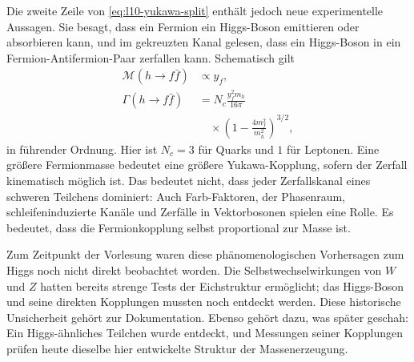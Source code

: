 Die zweite Zeile von \eqref{eq:l10-yukawa-split} enthält jedoch neue experimentelle Aussagen. Sie besagt, dass ein Fermion ein Higgs-Boson emittieren oder absorbieren kann, und im gekreuzten Kanal gelesen, dass ein Higgs-Boson in ein Fermion-Antifermion-Paar zerfallen kann. Schematisch gilt
\begin{equation}
\begin{aligned}
  \mathcal M(h\to f\bar f)&\propto y_f,
  \\
  \Gamma(h\to f\bar f)
  &=
  N_c\frac{y_f^2m_h}{16\pi}
  \\
  &\quad\times
  \left(1-\frac{4m_f^2}{m_h^2}\right)^{3/2},
\end{aligned}
  \label{eq:l10-higgs-fermion-width}
\end{equation}
in führender Ordnung. Hier ist \(N_c=3\) für Quarks und \(1\) für Leptonen. Eine größere Fermionmasse bedeutet eine größere Yukawa-Kopplung, sofern der Zerfall kinematisch möglich ist. Das bedeutet nicht, dass jeder Zerfallskanal eines schweren Teilchens dominiert: Auch Farb-Faktoren, der Phasenraum, schleifeninduzierte Kanäle und Zerfälle in Vektorbosonen spielen eine Rolle. Es bedeutet, dass die Fermionkopplung selbst proportional zur Masse ist.

\begin{classroomqa}
\end{classroomqa}

Zum Zeitpunkt der Vorlesung waren diese phänomenologischen Vorhersagen zum Higgs noch nicht direkt beobachtet worden. Die Selbstwechselwirkungen von \(W\) und \(Z\) hatten bereits strenge Tests der Eichstruktur ermöglicht; das Higgs-Boson und seine direkten Kopplungen mussten noch entdeckt werden. Diese historische Unsicherheit gehört zur Dokumentation. Ebenso gehört dazu, was später geschah: Ein Higgs-ähnliches Teilchen wurde entdeckt, und Messungen seiner Kopplungen prüfen heute dieselbe hier entwickelte Struktur der Massenerzeugung.

